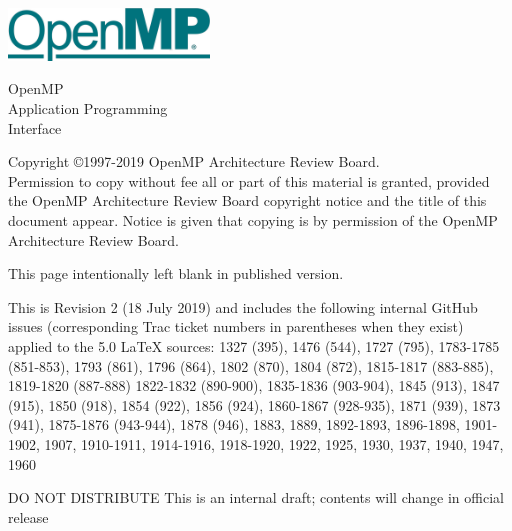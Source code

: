 
  \begin{titlepage}
    \begin{flushleft}
     \hspace{-6em} \includegraphics[width=0.4\textwidth]{openmp-logo.png}
    \end{flushleft}

    \begin{adjustwidth}{-0.75in}{0in}
    \begin{center}
      \Huge
      \textsf{OpenMP\\Application Programming\\Interface}

      \vspace{0.5in}\textsf{    }\vspace{-0.7in}
      \normalsize

      \vspace{1.0in}

      \textbf{\ompversion{}}
    \end{center}
    \end{adjustwidth}

    \vspace{3.0in}

\begin{adjustwidth}{0pt}{1em}\setlength{\parskip}{0.25\baselineskip}%
Copyright \copyright 1997-2019 OpenMP Architecture Review Board.\\
Permission to copy without fee all or part of this material is granted,
provided the OpenMP Architecture Review Board copyright notice and
the title of this document appear. Notice is given that copying is by
permission of the OpenMP Architecture Review Board.\end{adjustwidth}

  \end{titlepage}


\clearpage
\thispagestyle{empty}
\phantom{a}
This page intentionally left blank in published version.

This is Revision 2 (18 July 2019) and includes the following internal 
GitHub issues (corresponding Trac ticket numbers in parentheses when
they exist) applied to the 5.0 LaTeX sources: 1327 (395), 1476 (544), 
1727 (795), 1783-1785 (851-853), 1793 (861), 1796 (864), 1802 (870), 
1804 (872), 1815-1817 (883-885), 1819-1820 (887-888) 1822-1832 (890-900), 
1835-1836 (903-904), 1845 (913), 1847 (915), 1850 (918), 
1854 (922), 1856 (924), 1860-1867 (928-935), 1871 (939), 1873 (941), 
1875-1876 (943-944), 1878 (946), 1883, 1889, 1892-1893, 1896-1898, 
1901-1902, 1907, 1910-1911, 1914-1916, 1918-1920, 1922, 1925, 1930, 
1937, 1940, 1947, 1960

DO NOT DISTRIBUTE
This is an internal draft; contents will change in official release

\vfill

